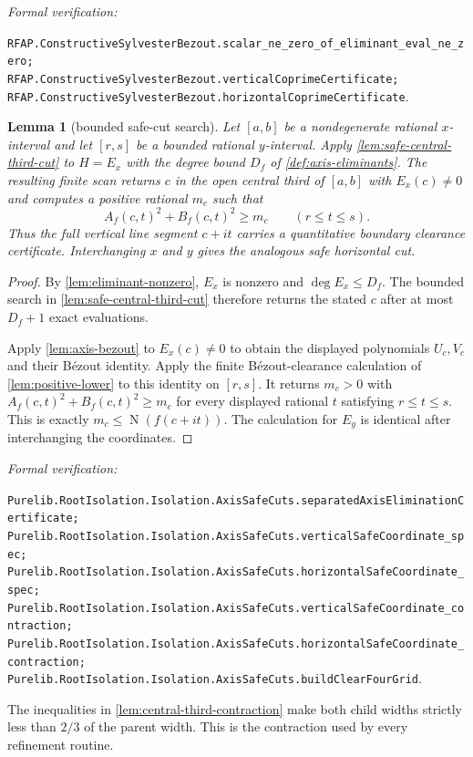 \documentclass[11pt]{article}
\newtheorem{lemma}[theorem]{Lemma}
\newcommand{\Norm}[1]{\operatorname{N}\!\left(#1\right)}
\newcommand{\leanref}[1]{\par\smallskip\noindent
  \emph{Formal verification:}\par\nobreak
  {\raggedright\nolinkurl{#1}.\par}}
\begin{document}
\leanref{RFAP.ConstructiveSylvesterBezout.scalar_ne_zero_of_eliminant_eval_ne_zero;
RFAP.ConstructiveSylvesterBezout.verticalCoprimeCertificate;
RFAP.ConstructiveSylvesterBezout.horizontalCoprimeCertificate}

\begin{lemma}[bounded safe-cut search]
\label{lem:safe-cut}
Let $[a,b]$ be a nondegenerate rational $x$-interval and let $[r,s]$ be a
bounded rational $y$-interval.  Apply \cref{lem:safe-central-third-cut} to
$H=E_x$ with the degree bound $D_f$ of \cref{def:axis-eliminants}.
The resulting finite scan returns $c$ in the open central third of $[a,b]$
with $E_x(c)\ne0$ and computes a positive rational $m_c$ such that
\[
       A_f(c,t)^2+B_f(c,t)^2\ge m_c
       \qquad(r\le t\le s).
\]
Thus the full vertical line segment $c+it$ carries a quantitative boundary
clearance certificate.  Interchanging $x$ and $y$ gives the analogous safe
horizontal cut.
\end{lemma}

\begin{proof}
By \cref{lem:eliminant-nonzero}, $E_x$ is nonzero and
$\deg E_x\le D_f$.  The bounded search in
\cref{lem:safe-central-third-cut} therefore returns the stated $c$ after at most
$D_f+1$ exact evaluations.

Apply \cref{lem:axis-bezout} to $E_x(c)\ne0$ to obtain the displayed
polynomials $U_c,V_c$ and their Bézout identity.
Apply the finite Bézout-clearance calculation of
\cref{lem:positive-lower} to this identity on $[r,s]$.
It returns $m_c>0$ with
$A_f(c,t)^2+B_f(c,t)^2\ge m_c$ for every displayed rational $t$ satisfying
$r\le t\le s$.  This is exactly $m_c\le\Norm{f(c+it)}$.  The calculation
for $E_y$ is identical after interchanging the coordinates.
\end{proof}

\leanref{Purelib.RootIsolation.Isolation.AxisSafeCuts.separatedAxisEliminationCertificate;
Purelib.RootIsolation.Isolation.AxisSafeCuts.verticalSafeCoordinate_spec;
Purelib.RootIsolation.Isolation.AxisSafeCuts.horizontalSafeCoordinate_spec;
Purelib.RootIsolation.Isolation.AxisSafeCuts.verticalSafeCoordinate_contraction;
Purelib.RootIsolation.Isolation.AxisSafeCuts.horizontalSafeCoordinate_contraction;
Purelib.RootIsolation.Isolation.AxisSafeCuts.buildClearFourGrid}

The inequalities in \cref{lem:central-third-contraction} make both child widths
strictly less than $2/3$ of the parent width.  This is the contraction used
by every refinement routine.
\end{document}
